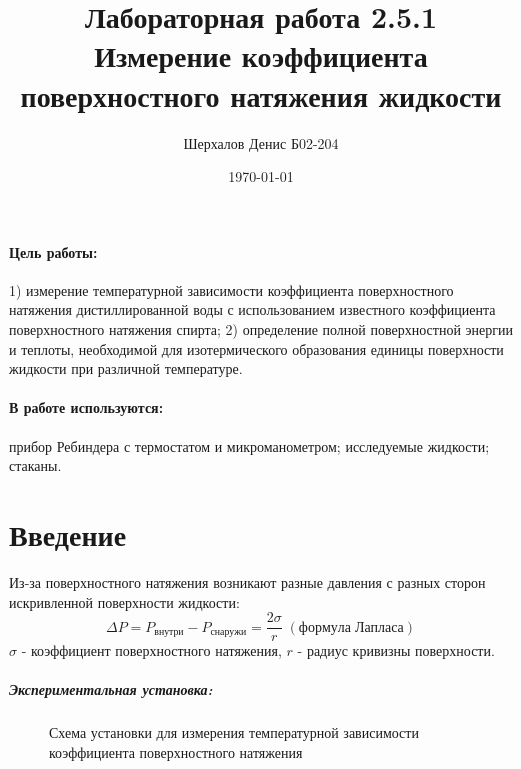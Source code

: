\documentclass[a4paper,12pt]{article}
\author{Шерхалов Денис Б02-204}
\title{Лабораторная работа 2.5.1 \\
	\textbf{Измерение коэффициента поверхностного натяжения жидкости}}
\date{\today}
\begin{document}
	
	{\Large \maketitle}

	\paragraph*{Цель работы:} 1) измерение температурной зависимости коэффициента поверхностного натяжения дистиллированной воды с использованием известного коэффициента поверхностного натяжения спирта;  2) определение полной поверхностной энергии и теплоты, необходимой для изотермического образования единицы  поверхности жидкости  при различной температуре. 
	\paragraph*{В работе используются:} прибор  Ребиндера с термостатом и микроманометром; исследуемые жидкости; стаканы.
	
	\section{Введение}
	Из-за поверхностного натяжения возникают разные давления с разных сторон искривленной поверхности жидкости:
	\begin{equation}
		\Delta P = P_{внутри} - P_{снаружи} = \frac{2\sigma}{r} \;(формула\; Лапласа)
	\end{equation}
	$\sigma$ - коэффициент поверхностного натяжения, $r$ - радиус кривизны поверхности.
	
	\subparagraph*{Экспериментальная установка:}
	
	\begin{figure}[h!]
	\caption[]{\label{fig:1} Схема установки для измерения температурной зависимости коэффициента поверхностного натяжения}
	\end{figure}
\end{document}

